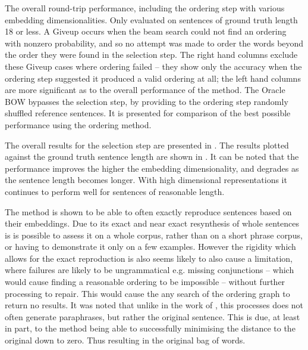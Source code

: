 \documentclass[11pt]{article}
\numberwithin{equation}{section}
\numberwithin{figure}{section}
\theoremstyle{plain}
\theoremstyle{definition}
\begin{document}
\begin{table}[t!]
	\centering
	\caption{ The overall round-trip performance, including the ordering step with various embedding dimensionalities. Only evaluated on sentences of ground truth length 18 or less. A Giveup occurs when the beam search could not find an ordering with nonzero probability, and so no attempt was made to order the words beyond the order they were found in the selection step. The right hand columns exclude these Giveup cases where ordering failed -- they show only the accuracy when the ordering step suggested it produced a valid ordering at all; the left hand columns are more significant as to the overall performance of the method. The Oracle BOW bypasses the selection step, by providing to the ordering step randomly shuffled reference sentences. It is presented for comparison of the best possible performance using the ordering method.}
	\label{table:ordering}
\end{table}


The overall results for the selection step are presented in . The results plotted against the ground truth sentence length are shown in . It can be noted that the performance improves the higher the embedding dimensionality, and degrades as the sentence length becomes longer. With high dimensional representations it continues to perform well for sentences of reasonable length.


The method is shown to be able to often exactly reproduce sentences based on their embeddings.  Due to its exact and near exact resynthesis of whole sentences is is possible to assess it on a whole corpus, rather than on a short phrase corpus, or having to demonstrate it only on a few examples.  However the rigidity which allows for the exact reproduction is also seems likely to also cause a limitation, where failures are likely to be ungrammatical e.g. missing conjunctions -- which would cause finding a reasonable ordering to be impossible -- without further processing to repair. This would cause the any search of the ordering graph to return no results.
It was noted that unlike in the work of \textcite{iyyer2014generating}, this processes does not often generate paraphrases, but rather the original sentence. This is due, at least in part, to the method being able to successfully minimising the distance to the original down to zero. Thus resulting in the original bag of words.
\end{document}
